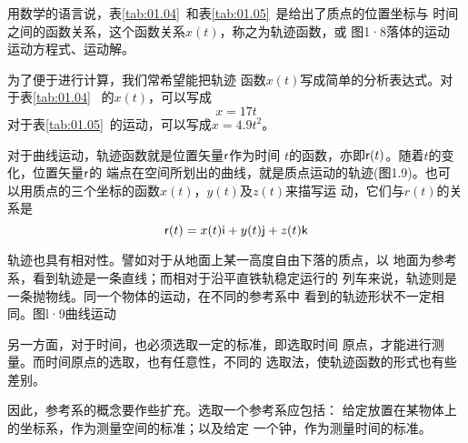 用数学的语言说，表\ref{tab:01.04}~和表\ref{tab:01.05}~是给出了质点的位置坐标与
时间之间的函数关系，这个函数关系$x(t)$，称之为轨迹函数，或
图1·8落体的运动
运动方程式、运动解。

为了便于进行计算，我们常希望能把轨迹
函数$x(t)$写成简单的分析表达式。对于表\ref{tab:01.04}~
的$x(t)$，可以写成
\begin{equation}\label{eqn:01.05.01}
    x=17t
\end{equation}
对于表\ref{tab:01.05}~的运动，可以写成$x=4.9t^2$。

对于曲线运动，轨迹函数就是位置矢量${\sf r}$作为时间
$t$的函数，亦即${\sf r}(t)$。随着$t$的变化，位置矢量${\sf r}$的
端点在空间所划出的曲线，就是质点运动的轨迹(图1.9)。也可
以用质点的三个坐标的函数$x(t)$，$y(t)$及$z(t)$来描写运
动，它们与$r(t)$的关系是
\begin{equation}\label{eqn:01.05.02}
    {\sf r}(t)=x(t){\sf i}+y(t){\sf j}+z(t){\sf k}
\end{equation}

轨迹也具有相对性。譬如对于从地面上某一高度自由下落的质点，以
地面为参考系，看到轨迹是一条直线；而相对于沿平直铁轨稳定运行的
列车来说，轨迹则是一条抛物线。同一个物体的运动，在不同的参考系中
看到的轨迹形状不一定相同。图l·9曲线运动

另一方面，对于时间，也必须选取一定的标准，即选取时间
原点，才能进行测量。而时间原点的选取，也有任意性，不同的
选取法，使轨迹函数的形式也有些差别。

因此，参考系的概念要作些扩充。选取一个参考系应包括：
给定放置在某物体上的坐标系，作为测量空间的标准；以及给定
一个钟，作为测量时间的标准。